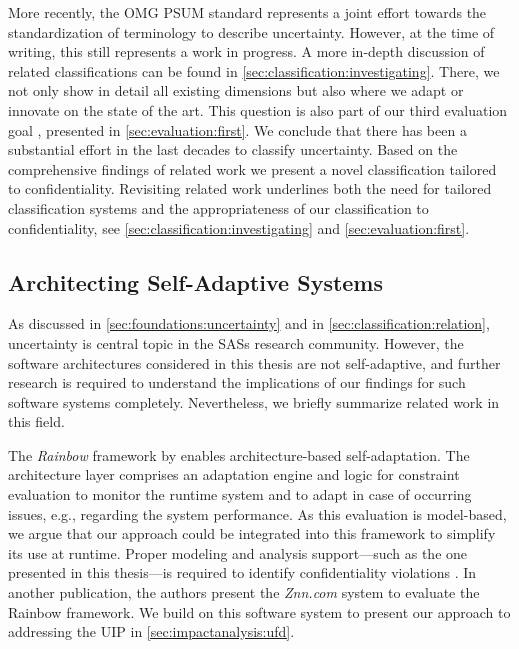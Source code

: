 More recently, the \ac{OMG} \ac{PSUM} \cite{PSUM} standard represents a joint effort towards the standardization of terminology to describe uncertainty.
However, at the time of writing, this still represents a work in progress.
A more in-depth discussion of related classifications can be found in \autoref{sec:classification:investigating}.
There, we not only show in detail all existing dimensions but also where we adapt or innovate on the state of the art.
This question is also part of our third evaluation goal , presented in \autoref{sec:evaluation:first}.
We conclude that there has been a substantial effort in the last decades to classify uncertainty.
Based on the comprehensive findings of related work we present a novel classification tailored to confidentiality.
Revisiting related work underlines both the need for tailored classification systems and the appropriateness of our classification to confidentiality, see \autoref{sec:classification:investigating} and \autoref{sec:evaluation:first}.


\subsection{Architecting Self-Adaptive Systems}

As discussed in \autoref{sec:foundations:uncertainty} and in \autoref{sec:classification:relation}, uncertainty is central topic in the \acp{SAS} research community.
However, the software architectures considered in this thesis are not self-adaptive, and further research is required to understand the implications of our findings for such software systems completely.
Nevertheless, we briefly summarize related work in this field.

The \emph{Rainbow} framework by \textcite{garlan_rainbow_2004} enables architecture-based self-adaptation.
The architecture layer comprises an adaptation engine and logic for constraint evaluation to monitor the runtime system and to adapt in case of occurring issues, e.g., regarding the system performance.
As this evaluation is model-based, we argue that our approach could be integrated into this framework to simplify its use at runtime.
Proper modeling and analysis support---such as the one presented in this thesis---is required to identify confidentiality violations \cite{seifermann_architectural_2022,schneider_how_2024}.
In another publication, the authors present the \emph{Znn.com} system to evaluate the Rainbow framework.
We build on this software system to present our approach to addressing the \ac{UIP} in \autoref{sec:impactanalysis:ufd}.

